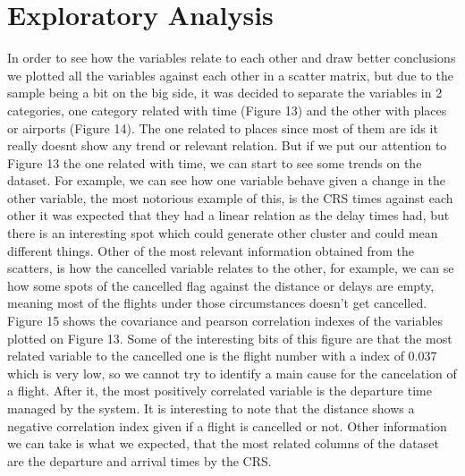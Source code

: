 \documentclass{article}
\begin{document}
    \section{Exploratory Analysis}
        In order to see how the variables relate to each other and draw better conclusions we plotted all the variables against each other in a scatter matrix, but due to the sample being a bit on the big side, it was decided to separate the variables in 2 categories, one category related with time (Figure 13) and the other with places or airports (Figure 14). The one related to places since most of them are ids it really doesnt show any trend or relevant relation. But if we put our attention to Figure 13 the one related with time, we can start to see some trends on the dataset. For example, we can see how one variable behave given a change in the other variable, the most notorious example of this, is the CRS times against each other it was expected that they had a linear relation as the delay times had, but there is an interesting spot which could generate other cluster and could mean different things. Other of the most relevant information obtained from the scatters, is how the cancelled variable relates to the other, for example, we can se how some spots of the cancelled flag against the distance or delays are empty, meaning most of the flights under those circumstances doesn't get cancelled.\newline
        Figure 15 shows the covariance and pearson correlation indexes of the variables plotted on Figure 13. Some of the interesting bits of this figure are that the most related variable to the cancelled one is the flight number with a index of 0.037 which is very low, so we cannot try to identify a main cause for the cancelation of a flight. After it, the most positively correlated variable is the departure time managed by the system. It is interesting to note that the distance shows a negative correlation index given if a flight is cancelled or not. Other information we can take is what we expected, that the most related columns of the dataset are the departure and arrival times by the CRS.
\end{document}

